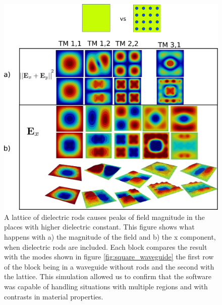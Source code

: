 \begin{figure}
\centering
\includegraphics[scale=0.1]{./img/finite_lattice.pdf}
\caption{A lattice of dielectric rods causes peaks of field magnitude in the places with higher dielectric constant. This figure shows what happens with a) the magnitude of the field and b) the x component, when dielectric rods are included. Each block compares the result with the modes shown in figure \ref{fig:square_waveguide} the first row of the block being in a waveguide without rods and the second with the lattice. This simulation allowed us to confirm that the software was capable of handling situations with multiple regions and with contrasts in material properties.}
\label{fig:fin_lat_waveguide}
\end{figure}

